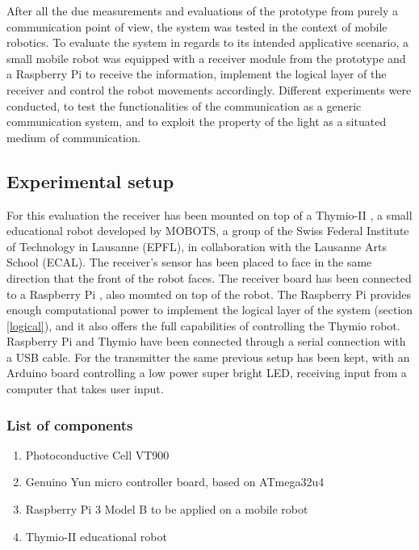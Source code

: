 
After all the due measurements and evaluations of the prototype from purely a communication point of view, the system was tested in the context of mobile robotics.
To evaluate the system in regards to its intended applicative scenario, a small mobile robot was equipped with a receiver module from the prototype and a Raspberry Pi to receive the information, implement the logical layer of the receiver and control the robot movements accordingly.
 Different experiments were conducted, to test the functionalities of the communication as a generic communication system, and to exploit the property of the light as a situated medium of communication.

\subsection{Experimental setup}
For this evaluation the receiver has been mounted on top of a Thymio-II \cite{thymio}, a small educational robot developed  by MOBOTS, a group of the Swiss Federal Institute of Technology in Lausanne (EPFL), in collaboration with the Lausanne Arts School (ECAL).
The receiver's sensor has been placed to face in the same direction that the front of the robot faces.
The receiver board has been connected to a Raspberry Pi \cite{raspberrypi}, also mounted on top of the robot.
The Raspberry Pi provides enough computational power to implement the logical layer of the system (section \ref{logical}), and it also offers the full capabilities of controlling the Thymio robot.
Raspberry Pi and Thymio have been connected through a serial connection with a USB cable.
For the transmitter the same previous setup has been kept, with an Arduino board controlling a low power super bright LED, receiving input from a computer that takes user input.

\subsubsection{List of components}
\begin{enumerate}
\item Photoconductive Cell VT900
\item Genuino Yun micro controller board, based on ATmega32u4 \cite{arduinoyun}
\item Raspberry Pi 3 Model B to be applied on a mobile robot
\item Thymio-II educational robot
\end{enumerate}


